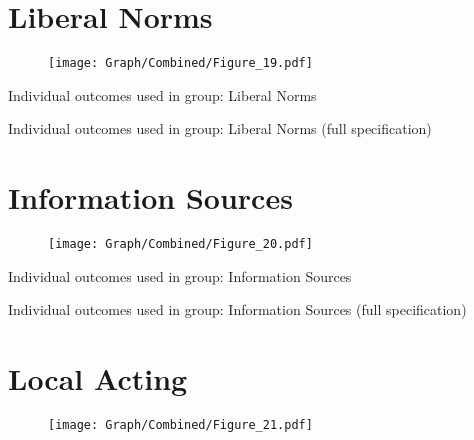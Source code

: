 \documentclass[10pt,a4paper]{article}
\begin{document}
\section{Liberal Norms}
\begin{table}[H]\centering

\end{table}
\begin{figure}[H]\centering
\texttt{[image: Graph/Combined/Figure\_19.pdf]}
\caption{} \label{fig:Fig_19}
\end{figure}

\begin{table}[H]\centering\caption{Individual outcomes used in group: Liberal Norms }
\resizebox{\textwidth}{!}{}
\end{table}
\begin{table}[H]\centering\caption{Individual outcomes used in group: Liberal Norms (full specification)}
\resizebox{\textwidth}{!}{}
\end{table}
\pagebreak
\section{Information Sources}
\begin{table}[H]\centering

\end{table}
\begin{figure}[H]\centering
\texttt{[image: Graph/Combined/Figure\_20.pdf]}
\caption{} \label{fig:Fig_20}
\end{figure}

\begin{table}[H]\centering\caption{Individual outcomes used in group: Information Sources }
\resizebox{\textwidth}{!}{}
\end{table}
\begin{table}[H]\centering\caption{Individual outcomes used in group: Information Sources (full specification)}
\resizebox{\textwidth}{!}{}
\end{table}
\pagebreak
\section{Local Acting}
\begin{table}[H]\centering

\end{table}
\begin{figure}[H]\centering
\texttt{[image: Graph/Combined/Figure\_21.pdf]}
\caption{} \label{fig:Fig_21}
\end{figure}
\end{document}
